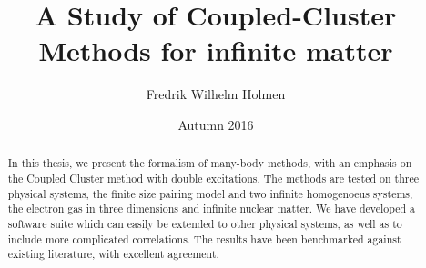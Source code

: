 \documentclass[twoside,english]{uiofysmaster}
\author{Fredrik Wilhelm Holmen}
\title{A Study of Coupled-Cluster Methods for infinite matter}
\date{Autumn 2016}
\begin{document}
\setlength{\belowdisplayskip}{12pt} \setlength{\belowdisplayshortskip}{12pt}
\setlength{\abovedisplayskip}{12pt} \setlength{\abovedisplayshortskip}{12pt}


\maketitle


\begin{abstract}
	In this thesis, we present the formalism of many-body methods,
        with an emphasis on the Coupled Cluster method with double
        excitations. The methods are tested on three physical systems,
        the finite size pairing model and two infinite homogenoeus
        systems, the electron gas in three dimensions and infinite
        nuclear matter. We have developed a software suite which can
        easily be extended to other physical systems, as well as to
        include more complicated correlations. The results have been
        benchmarked against existing literature, with excellent agreement. 
\end{abstract}
\end{document}
